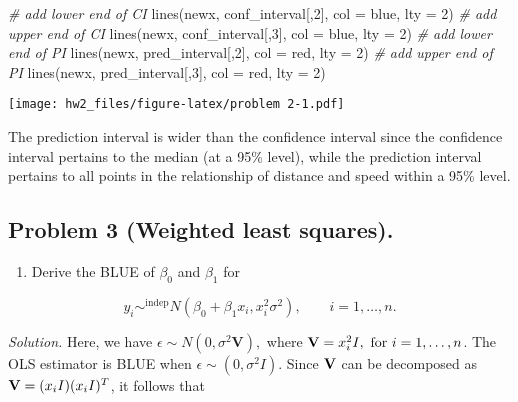 \documentclass[
]{article}
\newenvironment{Shaded}{\begin{snugshade}}{\end{snugshade}}
\newcommand{\AttributeTok}[1]{\textcolor[rgb]{0.77,0.63,0.00}{#1}}
\newcommand{\CommentTok}[1]{\textcolor[rgb]{0.56,0.35,0.01}{\textit{#1}}}
\newcommand{\DecValTok}[1]{\textcolor[rgb]{0.00,0.00,0.81}{#1}}
\newcommand{\FunctionTok}[1]{\textcolor[rgb]{0.00,0.00,0.00}{#1}}
\newcommand{\NormalTok}[1]{#1}
\newcommand{\StringTok}[1]{\textcolor[rgb]{0.31,0.60,0.02}{#1}}
\providecommand{\tightlist}{%
  \setlength{\itemsep}{0pt}\setlength{\parskip}{0pt}}
\begin{document}
\begin{Shaded}
\begin{Highlighting}[]
\CommentTok{\# add lower end of CI}
\FunctionTok{lines}\NormalTok{(newx, conf\_interval[,}\DecValTok{2}\NormalTok{], }\AttributeTok{col =} \StringTok{\textquotesingle{}blue\textquotesingle{}}\NormalTok{, }\AttributeTok{lty =} \DecValTok{2}\NormalTok{)}
\CommentTok{\# add upper end of CI}
\FunctionTok{lines}\NormalTok{(newx, conf\_interval[,}\DecValTok{3}\NormalTok{], }\AttributeTok{col =} \StringTok{\textquotesingle{}blue\textquotesingle{}}\NormalTok{, }\AttributeTok{lty =} \DecValTok{2}\NormalTok{)}
\CommentTok{\# add lower end of PI}
\FunctionTok{lines}\NormalTok{(newx, pred\_interval[,}\DecValTok{2}\NormalTok{], }\AttributeTok{col =} \StringTok{\textquotesingle{}red\textquotesingle{}}\NormalTok{, }\AttributeTok{lty =} \DecValTok{2}\NormalTok{)}
\CommentTok{\# add upper end of PI}
\FunctionTok{lines}\NormalTok{(newx, pred\_interval[,}\DecValTok{3}\NormalTok{], }\AttributeTok{col =} \StringTok{\textquotesingle{}red\textquotesingle{}}\NormalTok{, }\AttributeTok{lty =} \DecValTok{2}\NormalTok{)}
\end{Highlighting}
\end{Shaded}

\texttt{[image: hw2\_files/figure-latex/problem 2-1.pdf]}

The prediction interval is wider than the confidence interval since the
confidence interval pertains to the median (at a 95\% level), while the
prediction interval pertains to all points in the relationship of
distance and speed within a 95\% level.

\hypertarget{problem-3-weighted-least-squares.}{%
\subsection{Problem 3 (Weighted least
squares).}\label{problem-3-weighted-least-squares.}}

\begin{enumerate}
\def\labelenumi{(\alph{enumi})}
\tightlist
\item
  Derive the BLUE of \(\beta_0\) and \(\beta_1\) for
\end{enumerate}

\[
y_i \sim^{\text{indep}} N(\beta_0 + \beta_1 x_i, x_i^2 \sigma^2), \qquad i = 1, \dots, n.
\]

\emph{Solution.} Here, we have
\(\epsilon \sim N(0, \sigma^2 \textbf{V}),\) where
\(\textbf V = x_i^2I, \text{ for } i = 1,\dots, n\). The OLS estimator
is BLUE when \(\epsilon \sim (0, \sigma^2 I).\) Since \(\textbf V\) can
be decomposed as \(\textbf V = (x_i I) (x_i I)^T\), it follows that
\end{document}
